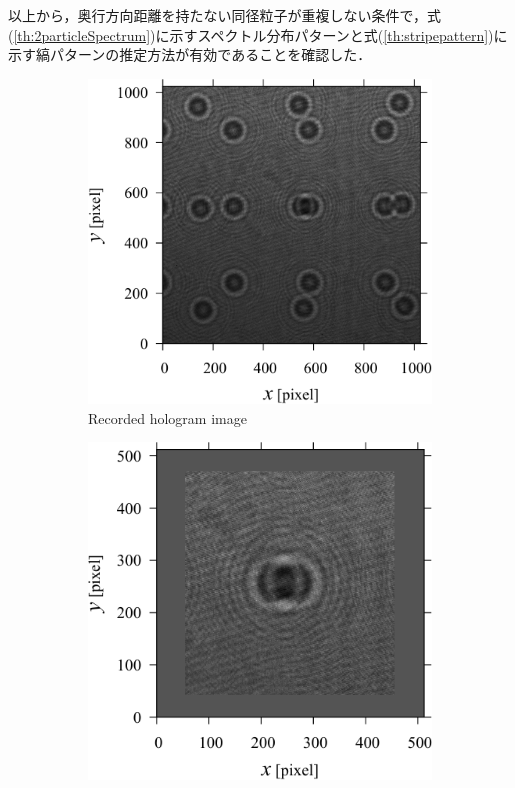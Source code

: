 以上から，奥行方向距離を持たない同径粒子が重複しない条件で，式(\ref{th:2particleSpectrum})に示すスペクトル分布パターンと式(\ref{th:stripepattern})に示す縞パターンの推定方法が有効であることを確認した．

\begin{figure}[H]
    \centering
    \begin{subfigure}[c]{0.45\linewidth}
        \includegraphics[width=\linewidth]{./Figure/4_Results/stripe_pattern_experiment/recorded_data/a.pdf}
        \caption{Recorded hologram image}
        \label{fig:stripePatternExpExample:a}
    \end{subfigure}
    \hfill
    \begin{subfigure}[c]{0.45\linewidth}
        \includegraphics[width=\linewidth]{./Figure/4_Results/stripe_pattern_experiment/recorded_data/b.pdf}

\end{subfigure}
\end{figure}
